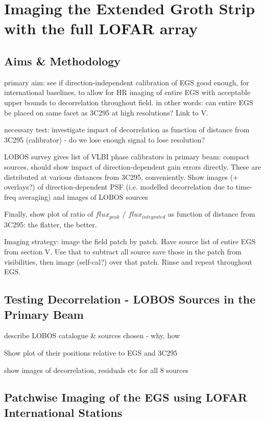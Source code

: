 \chapter{Imaging the Extended Groth Strip with the full LOFAR array}

\section{Aims \& Methodology}

\pg
primary aim: see if direction-independent calibration of EGS good enough, for international baselines, to allow for HR imaging of entire EGS with acceptable upper bounds to decorrelation throughout field.
\pg
in other words: can entire EGS be placed on same facet as 3C295 at high resolutions? Link to V.

\pg
necessary test: investigate impact of decorrelation as function of distance from 3C295 (calibrator) - do we lose enough signal to lose resolution?

\pg LOBOS survey gives list of VLBI phase calibrators in primary beam: compact sources, should show impact of direction-dependent gain errors directly. These are distributed at various distances from 3C295, conveniently.
\pg
Show images (+ overlays?) of direction-dependent PSF (i.e. modelled decorrelation due to time-freq averaging) and images of LOBOS sources

\pg
Finally, show plot of ratio of $flux_{peak}$ / $flux_{integrated}$ as function of distance from 3C295: the flatter, the better.

\pg
Imaging strategy: image the field patch by patch.
\pg
Have source list of entire EGS from section V. Use that to subtract all source save those in the patch from visibilities, then image (self-cal?) over that patch. Rinse and repeat throughout EGS.


\section{Testing Decorrelation - LOBOS Sources in the Primary Beam}

\pg
describe LOBOS catalogue \& sources chosen  - why, how

\pg
Show plot of their positions relative to EGS and 3C295

\pg
show images of decorrelation, residuals etc for all 8 sources


\section{Patchwise Imaging of the EGS using LOFAR International Stations}

\newpage